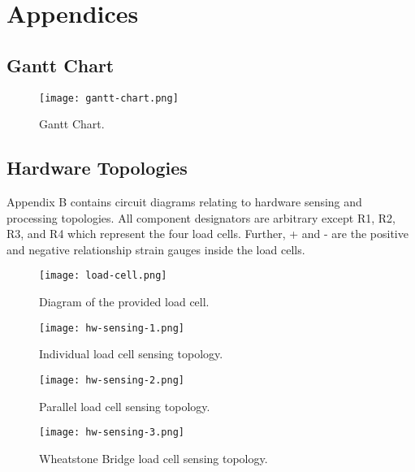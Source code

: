 
\part{Appendices}

\chapter{Gantt Chart}

\begin{figure}[!ht]
	\centering
	\texttt{[image: gantt-chart.png]}
	\caption{Gantt Chart.}
	\label{fig:gantt-chart-1}
\end{figure}

\chapter{Hardware Topologies}

Appendix B contains circuit diagrams relating to hardware sensing and processing topologies. All component designators are arbitrary except R1, R2, R3, and R4 which represent the four load cells. Further, + and - are the positive and negative relationship strain gauges inside the load cells.

\begin{figure}[!ht]
	\centering
	\texttt{[image: load-cell.png]}
	\caption{Diagram of the provided load cell.}
	\label{fig:load_cell}
\end{figure}

\begin{figure}[!ht]
	\centering
	\texttt{[image: hw-sensing-1.png]}
	\caption{Individual load cell sensing topology.}
	\label{fig:sense-1}
\end{figure}

\begin{figure}[!ht]
	\centering
	\texttt{[image: hw-sensing-2.png]}
	\caption{Parallel load cell sensing topology.}
	\label{fig:sense-2}
\end{figure}

\begin{figure}[!ht]
	\centering
	\texttt{[image: hw-sensing-3.png]}
	\caption{Wheatstone Bridge load cell sensing topology.}
	\label{fig:sense-3}
\end{figure}

